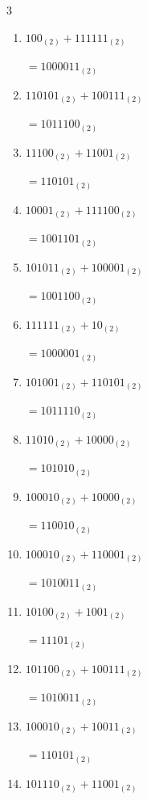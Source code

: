 \begin{multicols}{3}
\begin{enumerate}
        $=1001011_{(2)}$

  \item $100_{(2)} + 111111_{(2)}$

        $=1000011_{(2)}$

  \item $110101_{(2)} + 100111_{(2)}$

        $=1011100_{(2)}$

  \item $11100_{(2)} + 11001_{(2)}$

        $=110101_{(2)}$

  \item $10001_{(2)} + 111100_{(2)}$

        $=1001101_{(2)}$

  \item $101011_{(2)} + 100001_{(2)}$

        $=1001100_{(2)}$

  \item $111111_{(2)} + 10_{(2)}$

        $=1000001_{(2)}$

  \item $101001_{(2)} + 110101_{(2)}$

        $=1011110_{(2)}$

  \item $11010_{(2)} + 10000_{(2)}$

        $=101010_{(2)}$

  \item $100010_{(2)} + 10000_{(2)}$

        $=110010_{(2)}$

\columnbreak %

  \item $100010_{(2)} + 110001_{(2)}$

        $=1010011_{(2)}$

  \item $10100_{(2)} + 1001_{(2)}$

        $=11101_{(2)}$

  \item $101100_{(2)} + 100111_{(2)}$

        $=1010011_{(2)}$

  \item $100010_{(2)} + 10011_{(2)}$

        $=110101_{(2)}$

  \item $101110_{(2)} + 11001_{(2)}$


\end{enumerate}
\end{multicols}
